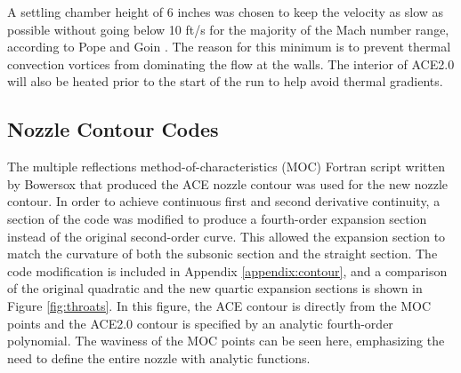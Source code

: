 A settling chamber height of 6 inches was chosen to keep the velocity as slow as possible without going below 10 ft/s for the majority of the Mach number range, according to Pope and Goin \cite{pope}. The reason for this minimum is to prevent thermal convection vortices from dominating the flow at the walls. The interior of ACE2.0 will also be heated prior to the start of the run to help avoid thermal gradients. 


    
\subsection{Nozzle Contour Codes}

The multiple reflections method-of-characteristics (MOC) Fortran script written by Bowersox that produced the ACE nozzle contour was used for the new nozzle contour. In order to achieve continuous first and second derivative continuity, a section of the code was modified to produce a fourth-order expansion section instead of the original second-order curve. This allowed the expansion section to match the curvature of both the subsonic section and the straight section. The code modification is included in Appendix \ref{appendix:contour}, and a comparison of the original quadratic and the new quartic expansion sections is shown in Figure \ref{fig:throats}. In this figure, the ACE contour is directly from the MOC points and the ACE2.0 contour is specified by an analytic fourth-order polynomial. The waviness of the MOC points can be seen here, emphasizing the need to define the entire nozzle with analytic functions.

